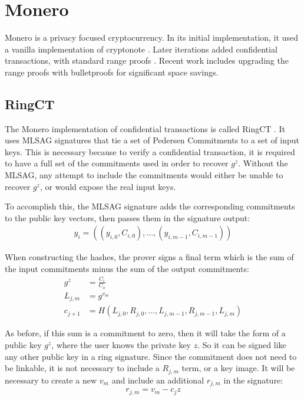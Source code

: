 \documentclass{article}
\begin{document}
\section{Monero}

Monero is a privacy focused cryptocurrency.  In its initial implementation, it used a vanilla implementation of cryptonote \cite{cryptonote}.  Later iterations added confidential transactions, with standard range proofs \cite{ringct}.  Recent work includes upgrading the range proofs with bulletproofs for significant space savings.


\subsection{RingCT}

The Monero implementation of confidential transactions is called RingCT \cite{ringct}.  It uses MLSAG signatures that tie a set of Pedersen Commitments to a set of input keys.  This is necessary because to verify a confidential transaction, it is required to have a full set of the commitments used in order to recover $g^z$.  Without the MLSAG, any attempt to include the commitments would either be unable to recover $g^z$, or would expose the real input keys.

To accomplish this, the MLSAG signature adds the corresponding commitments to the public key vectors, then passes them in the signature output:
\begin{align}
  y_i = ((y_{i,0}, C_{i,0}), ..., (y_{i,m-1}, C_{i,m-1}))
\end{align}

When constructing the hashes, the prover signs a final term which is the sum of the input commitments minus the sum of the output commitments:
\begin{align}
  g^z &= \frac{C_i}{C_o}\\
  L_{j,m} &= g^{v_m}\\
  c_{j+1} &= H(L_{j,0}, R_{j,0}, ... , L_{j,m-1}, R_{j, m-1}, L_{j,m})
\end{align}

As before, if this sum is a commitment to zero, then it will take the form of a public key $g^z$, where the user knows the private key $z$.  So it can be signed like any other public key in a ring signature.  Since the commitment does not need to be linkable, it is not necessary to include a $R_{j,m}$ term, or a key image.  It will be necessary to create a new $v_m$ and include an additional $r_{j,m}$ in the signature:
\begin{align}
  r_{j,m} = v_m - c_j z
\end{align}
\end{document}
